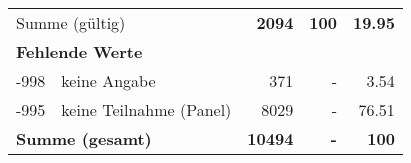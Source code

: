 \begin{longtable}{lXrrr}
     \midrule
     \multicolumn{2}{l}{Summe (gültig)} &
       \textbf{\num{2094}} &
     \textbf{\num{100}} &
       \textbf{\num[round-mode=places,round-precision=2]{19.95}} \\
     \multicolumn{5}{l}{\textbf{Fehlende Werte}}\\
       -998 &
       keine Angabe &
         \num{371} &
        - &
         \num[round-mode=places,round-precision=2]{3.54} \\
       -995 &
       keine Teilnahme (Panel) &
         \num{8029} &
        - &
         \num[round-mode=places,round-precision=2]{76.51} \\
     \midrule
     \multicolumn{2}{l}{\textbf{Summe (gesamt)}} &
          \textbf{\num{10494}} &
        \textbf{-} &
        \textbf{\num{100}} \\
     \bottomrule
     \end{longtable}
     
